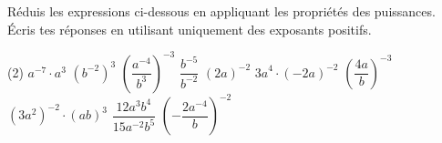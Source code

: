 %
%
    Réduis les expressions ci-dessous en appliquant les propriétés des puissances.
    Écris tes réponses en utilisant uniquement des exposants positifs.
    \begin{tasks}(2)
        \task \(a^{- 7} \cdot a^{3}\)
        \task \(\left( b^{- 2} \right)^{3}\)
        \task \(\left( \dfrac{a^{- 4}}{b^{3}} \right)^{- 3}\)
        \task \(\dfrac{b^{- 5}}{b^{- 2}}\)
        \task \({(2a)}^{- 2}\)
        \task \({3a}^{4} \cdot ( - 2a)^{- 2}\)
        \task \(\left( \dfrac{4a}{b} \right)^{- 3}\)
        \task \(\left( 3a^{2} \right)^{- 2} \cdot (ab)^{3}\)
        \task \(\dfrac{12a^{3}b^{4}}{15a^{- 2}b^{5}}\)
        \task \(\left( - \dfrac{2a^{- 4}}{b} \right)^{- 2}\)
    \end{tasks}
